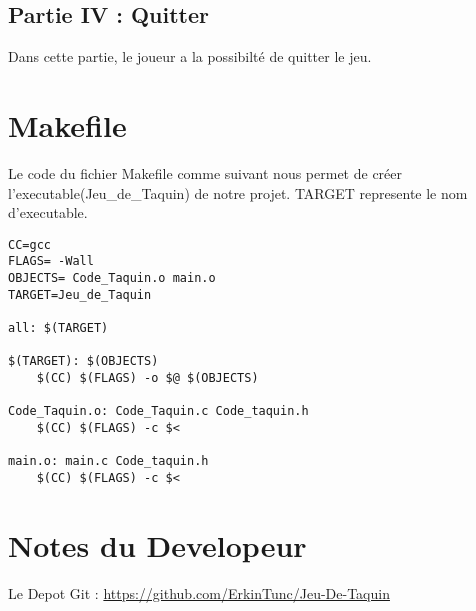 \documentclass{article}
\begin{document}
\subsection{Partie IV : Quitter}
Dans cette partie, le joueur a la possibilté de quitter le jeu.

\section{Makefile}
Le code du fichier Makefile comme suivant nous permet de créer l'executable(Jeu\_de\_Taquin) de notre projet.
TARGET represente le nom d'executable.
\begin{lstlisting}
CC=gcc
FLAGS= -Wall
OBJECTS= Code_Taquin.o main.o
TARGET=Jeu_de_Taquin

all: $(TARGET)

$(TARGET): $(OBJECTS)
	$(CC) $(FLAGS) -o $@ $(OBJECTS)

Code_Taquin.o: Code_Taquin.c Code_taquin.h
	$(CC) $(FLAGS) -c $<

main.o: main.c Code_taquin.h
	$(CC) $(FLAGS) -c $<
\end{lstlisting}

\section{Notes du Developeur}
Le Depot Git : \url{https://github.com/ErkinTunc/Jeu-De-Taquin} \\
\end{document}

